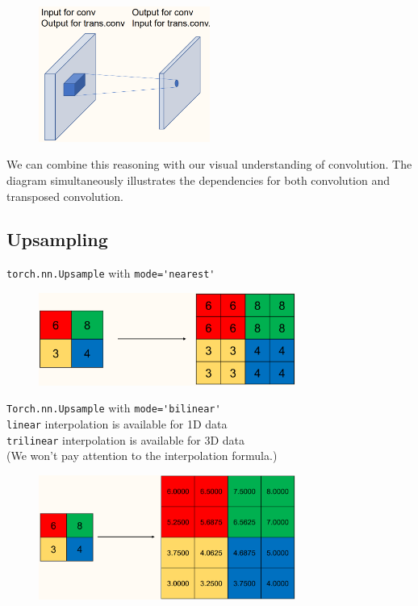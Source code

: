 \begin{figure}[H]
    \centering
    \includegraphics[width=0.5\textwidth]{.././assets/8.17.png}
\end{figure}

We can combine this reasoning with our visual understanding of convolution. The diagram simultaneously illustrates the dependencies for both convolution and transposed convolution.

\subsection{Upsampling}

\begin{concept}[8.17][Upsampling]
    \verb|torch.nn.Upsample| with \verb|mode='nearest'|

    \begin{figure}[H]
        \centering
        \includegraphics[width=0.75\textwidth]{.././assets/8.18.png}
    \end{figure}
\end{concept}

\begin{concept}[8.18][Upsampling]
    \verb|Torch.nn.Upsample| with \verb|mode='bilinear'|\\
    \verb|linear| interpolation is available for 1D data\\
    \verb|trilinear| interpolation is available for 3D data\\
    (We won't pay attention to the interpolation formula.)

    \begin{figure}[H]
        \centering
        \includegraphics[width=0.75\textwidth]{.././assets/8.19.png}
    \end{figure}
\end{concept}

